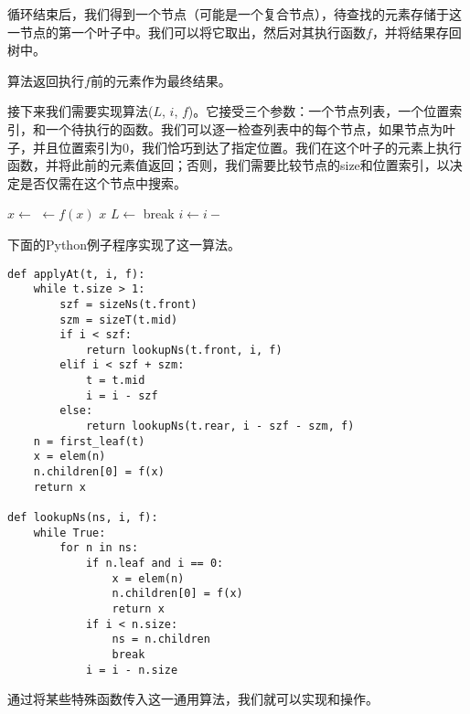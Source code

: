 \documentclass[UTF8]{article}
\begin{document}
循环结束后，我们得到一个节点（可能是一个复合节点），待查找的元素存储于这一节点的第一个叶子中。我们可以将它取出，然后对其执行函数$f$，并将结果存回树中。

算法返回执行$f$前的元素作为最终结果。

接下来我们需要实现算法($L$, $i$, $f$)。它接受三个参数：一个节点列表，一个位置索引，和一个待执行的函数。我们可以逐一检查列表中的每个节点，如果节点为叶子，并且位置索引为0，我们恰巧到达了指定位置。我们在这个叶子的元素上执行函数，并将此前的元素值返回；否则，我们需要比较节点的size和位置索引，以决定是否仅需在这个节点中搜索。

\begin{algorithmic}
  \Loop
        \State $x \gets $ 
        \State {} $\gets f(x)$
        \State \Return $x$
      \EndIf
        \State $L \gets $ 
        \State break
      \EndIf
      \State $i \gets i - $ 
    \EndFor
  \EndLoop
\EndFunction
\end{algorithmic}

下面的Python例子程序实现了这一算法。

\lstset{language=Python}
\begin{lstlisting}
def applyAt(t, i, f):
    while t.size > 1:
        szf = sizeNs(t.front)
        szm = sizeT(t.mid)
        if i < szf:
            return lookupNs(t.front, i, f)
        elif i < szf + szm:
            t = t.mid
            i = i - szf
        else:
            return lookupNs(t.rear, i - szf - szm, f)
    n = first_leaf(t)
    x = elem(n)
    n.children[0] = f(x)
    return x

def lookupNs(ns, i, f):
    while True:
        for n in ns:
            if n.leaf and i == 0:
                x = elem(n)
                n.children[0] = f(x)
                return x
            if i < n.size:
                ns = n.children
                break
            i = i - n.size
\end{lstlisting}

通过将某些特殊函数传入这一通用算法，我们就可以实现和操作。

\begin{algorithmic}
  \State \Return {}
\EndFunction
\Statex
{}
  \State \Return {}
\EndFunction
\end{algorithmic}
\end{document}
